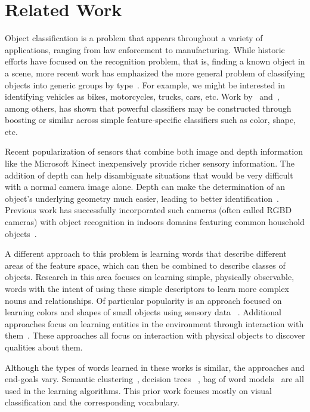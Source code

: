\documentclass[11pt]{article}
\newcommand{\xxx}[1]{{\bf \color{red} #1}}
\begin{document}
\section{Related Work}

Object classification is a problem that appears throughout a variety of
applications, ranging from law enforcement to manufacturing. While historic
efforts have focused on the recognition problem, that is, finding a known object
in a scene, more recent work has emphasized the more general problem of
classifying objects into generic groups by type~\cite{huber2004parts}. For example,
we might be interested in identifying vehicles as bikes, motorcycles, trucks,
cars, etc. Work by~\cite{nilsback2006visual} and~\cite{gehler2009feature}, among
others, has shown that powerful classifiers may be constructed through boosting
or similar across simple feature-specific classifiers such as color, shape, etc.

Recent popularization of sensors that combine both image and depth information
like the Microsoft Kinect inexpensively provide richer sensory information. The
addition of depth can help disambiguate situations that would be very difficult
with a normal camera image alone. Depth can make the determination of an object’s
underlying geometry much easier, leading to better identification~\cite{marton2010hierarchical}.
Previous work has successfully incorporated such cameras (often called RGBD
cameras) with object recognition in indoors domains featuring common household
objects~\cite{marton2010hierarchical, lai2011sparse}.

A different approach to this problem is learning words that describe different
areas of the feature space, which can then be combined to describe classes of
objects. Research in this area focuses on learning simple, physically observable,
words with the intent of using these simple descriptors to learn more complex
nouns and relationships. Of particular popularity is an approach focused on
learning colors and shapes of small objects using sensory data
~\cite{zambuto2010visually, roy2002learning}. Additional approaches focus on learning entities in the
environment through interaction with them~\cite{gold2009robotic}. These approaches
all focus on interaction with physical objects to discover qualities about them.

Although the types of words learned in these works is similar, the approaches and
end-goals vary. Semantic clustering~\cite{zambuto2010visually}, decision trees
~\cite{gold2009robotic}, bag of word models~\cite{roy2002learning} are all used
in the learning algorithms. This prior work focuses mostly on visual classification
and the corresponding vocabulary.
\end{document}
